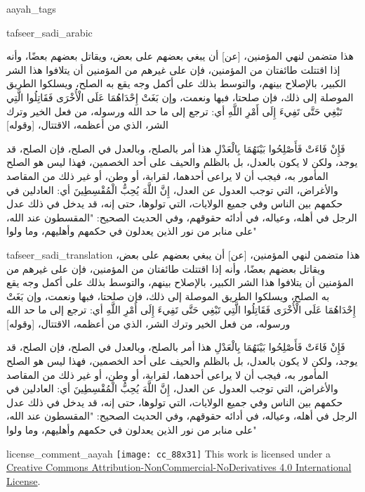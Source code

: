 \begin{taggedblock}{aayah_tags}
\end{taggedblock}
\begin{taggedblock}{tafseer_sadi_arabic}
\begin{Arabic}
هذا متضمن لنهي المؤمنين،
[عن]
أن يبغي بعضهم على بعض، ويقاتل  بعضهم بعضًا، وأنه إذا اقتتلت طائفتان من المؤمنين، فإن على غيرهم من المؤمنين أن يتلافوا هذا الشر الكبير، بالإصلاح بينهم، والتوسط بذلك على أكمل وجه يقع به الصلح، ويسلكوا الطريق الموصلة إلى ذلك، فإن صلحتا، فبها ونعمت، وإن
{ بَغَتْ إِحْدَاهُمَا عَلَى الْأُخْرَى فَقَاتِلُوا الَّتِي تَبْغِي حَتَّى تَفِيءَ إِلَى أَمْرِ اللَّهِ }
أي: ترجع إلى ما حد الله ورسوله، من فعل الخير وترك الشر، الذي من أعظمه، الاقتتال،
[وقوله]

{ فَإِنْ فَاءَتْ فَأَصْلِحُوا بَيْنَهُمَا بِالْعَدْلِ }
هذا أمر بالصلح، وبالعدل في الصلح، فإن الصلح، قد يوجد، ولكن لا يكون بالعدل، بل بالظلم والحيف على أحد الخصمين، فهذا ليس هو الصلح المأمور به، فيجب أن لا يراعى أحدهما، لقرابة، أو وطن، أو غير ذلك من المقاصد والأغراض، التي توجب العدول عن العدل،
{ إِنَّ اللَّهَ يُحِبُّ الْمُقْسِطِينَ }
أي: العادلين في حكمهم بين الناس وفي جميع الولايات، التي تولوها، حتى إنه، قد يدخل في ذلك عدل الرجل في أهله، وعياله، في أدائه حقوقهم، وفي الحديث الصحيح:
"المقسطون عند الله، على منابر من نور الذين يعدلون في حكمهم وأهليهم، وما ولوا"
\end{Arabic}
\end{taggedblock}
\begin{taggedblock}{tafseer_sadi_translation}
هذا متضمن لنهي المؤمنين،
[عن]
أن يبغي بعضهم على بعض، ويقاتل  بعضهم بعضًا، وأنه إذا اقتتلت طائفتان من المؤمنين، فإن على غيرهم من المؤمنين أن يتلافوا هذا الشر الكبير، بالإصلاح بينهم، والتوسط بذلك على أكمل وجه يقع به الصلح، ويسلكوا الطريق الموصلة إلى ذلك، فإن صلحتا، فبها ونعمت، وإن
{ بَغَتْ إِحْدَاهُمَا عَلَى الْأُخْرَى فَقَاتِلُوا الَّتِي تَبْغِي حَتَّى تَفِيءَ إِلَى أَمْرِ اللَّهِ }
أي: ترجع إلى ما حد الله ورسوله، من فعل الخير وترك الشر، الذي من أعظمه، الاقتتال،
[وقوله]

{ فَإِنْ فَاءَتْ فَأَصْلِحُوا بَيْنَهُمَا بِالْعَدْلِ }
هذا أمر بالصلح، وبالعدل في الصلح، فإن الصلح، قد يوجد، ولكن لا يكون بالعدل، بل بالظلم والحيف على أحد الخصمين، فهذا ليس هو الصلح المأمور به، فيجب أن لا يراعى أحدهما، لقرابة، أو وطن، أو غير ذلك من المقاصد والأغراض، التي توجب العدول عن العدل،
{ إِنَّ اللَّهَ يُحِبُّ الْمُقْسِطِينَ }
أي: العادلين في حكمهم بين الناس وفي جميع الولايات، التي تولوها، حتى إنه، قد يدخل في ذلك عدل الرجل في أهله، وعياله، في أدائه حقوقهم، وفي الحديث الصحيح:
"المقسطون عند الله، على منابر من نور الذين يعدلون في حكمهم وأهليهم، وما ولوا"
\end{taggedblock}
\begin{taggedblock}{license_comment_aayah}
\texttt{[image: cc\_88x31]}
This work is licensed under a 
\href{http://creativecommons.org/licenses/by-nc-nd/4.0/}{Creative Commons Attribution-NonCommercial-NoDerivatives 4.0 International License}.
\end{taggedblock}
\begin{comment}
Please use the following for footnotes:- Sample\footnoteQ{Text of Qur'an footnote goes here.}.
Sample\footnoteT{Text of Tafseer footnote goes here.}.
\end{comment}